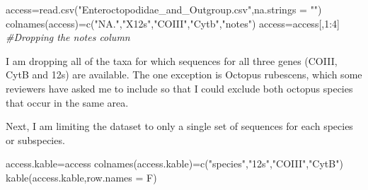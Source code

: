 \documentclass[
]{article}
\newenvironment{Shaded}{\begin{snugshade}}{\end{snugshade}}
\newcommand{\AttributeTok}[1]{\textcolor[rgb]{0.77,0.63,0.00}{#1}}
\newcommand{\CommentTok}[1]{\textcolor[rgb]{0.56,0.35,0.01}{\textit{#1}}}
\newcommand{\DecValTok}[1]{\textcolor[rgb]{0.00,0.00,0.81}{#1}}
\newcommand{\FunctionTok}[1]{\textcolor[rgb]{0.00,0.00,0.00}{#1}}
\newcommand{\NormalTok}[1]{#1}
\newcommand{\OtherTok}[1]{\textcolor[rgb]{0.56,0.35,0.01}{#1}}
\newcommand{\SpecialCharTok}[1]{\textcolor[rgb]{0.00,0.00,0.00}{#1}}
\newcommand{\StringTok}[1]{\textcolor[rgb]{0.31,0.60,0.02}{#1}}
\begin{document}
\begin{Shaded}
\begin{Highlighting}[]
\NormalTok{access}\OtherTok{=}\FunctionTok{read.csv}\NormalTok{(}\StringTok{"Enteroctopodidae\_and\_Outgroup.csv"}\NormalTok{,}\AttributeTok{na.strings =} \StringTok{""}\NormalTok{)}
\FunctionTok{colnames}\NormalTok{(access)}\OtherTok{=}\FunctionTok{c}\NormalTok{(}\StringTok{"NA."}\NormalTok{,}\StringTok{"X12s"}\NormalTok{,}\StringTok{"COIII"}\NormalTok{,}\StringTok{"Cytb"}\NormalTok{,}\StringTok{"notes"}\NormalTok{)}
\NormalTok{access}\OtherTok{=}\NormalTok{access[,}\DecValTok{1}\SpecialCharTok{:}\DecValTok{4}\NormalTok{] }\CommentTok{\#Dropping the notes column}
\end{Highlighting}
\end{Shaded}

I am dropping all of the taxa for which sequences for all three genes
(COIII, CytB and 12s) are available. The one exception is Octopus
rubescens, which some reviewers have asked me to include so that I could
exclude both octopus species that occur in the same area.

\begin{Shaded}
\end{Shaded}

Next, I am limiting the dataset to only a single set of sequences for
each species or subspecies.

\begin{Shaded}
\end{Shaded}

\begin{Shaded}
\begin{Highlighting}[]
\NormalTok{access.kable}\OtherTok{=}\NormalTok{access}
\FunctionTok{colnames}\NormalTok{(access.kable)}\OtherTok{=}\FunctionTok{c}\NormalTok{(}\StringTok{"species"}\NormalTok{,}\StringTok{"12s"}\NormalTok{,}\StringTok{"COIII"}\NormalTok{,}\StringTok{"CytB"}\NormalTok{)}
\FunctionTok{kable}\NormalTok{(access.kable,}\AttributeTok{row.names =}\NormalTok{ F)}
\end{Highlighting}
\end{Shaded}
\end{document}

